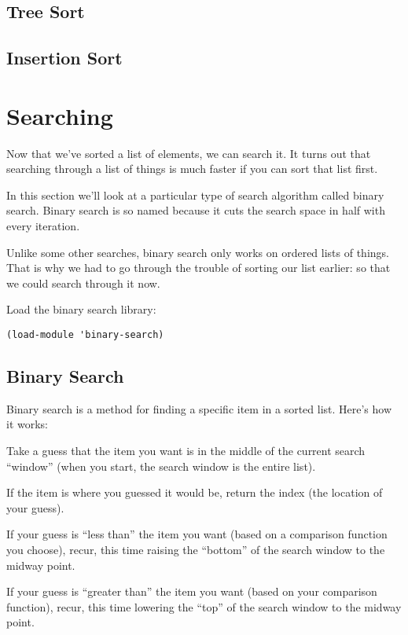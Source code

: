 \documentclass[12pt,openright,draft]{book}
\begin{document}
\subsection{Tree Sort}

\subsection{Insertion Sort}

\section{Searching}

Now that we've sorted a list of elements, we can search it.  It
turns out that searching through a list of things is much faster if
you can sort that list first.

In this section we'll look at a particular type of search algorithm
called binary search.  Binary search is so named because it cuts
the search space in half with every iteration.

Unlike some other searches, binary search only works on ordered
lists of things.  That is why we had to go through the trouble of
sorting our list earlier: so that we could search through it now.

Load the binary search library:

\begin{verbatim}
(load-module 'binary-search)
\end{verbatim}

\subsection{Binary Search}

Binary search is a method for finding a specific item in a sorted
list. Here's how it works:

Take a guess that the item you want is in the middle of the current
search ``window'' (when you start, the search window is the entire
list).

If the item is where you guessed it would be, return the index (the
location of your guess).

If your guess is ``less than'' the item you want (based on a
comparison function you choose), recur, this time raising the
``bottom'' of the search window to the midway point.

If your guess is ``greater than'' the item you want (based on your
comparison function), recur, this time lowering the ``top'' of the
search window to the midway point.
\end{document}
